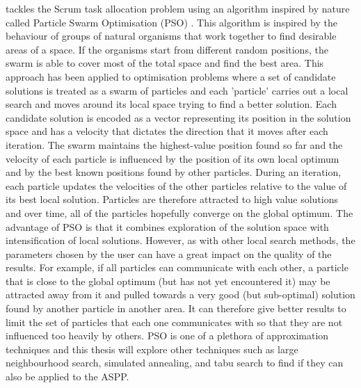 \citet{brezovcnik2018scrum} tackles the Scrum task allocation problem using an algorithm inspired by nature called Particle Swarm Optimisation (PSO) \citep{eberhart1995particle}. This algorithm is inspired by the behaviour of groups of natural organisms that work together to find desirable areas of a space. If the organisms start from different random positions, the swarm is able to cover most of the total space and find the best area. This approach has been applied to optimisation problems where a set of candidate solutions is treated as a swarm of particles and each 'particle' carries out a local search and moves around its local space trying to find a better solution. Each candidate solution is encoded as a vector representing its position in the solution space and has a velocity that dictates the direction that it moves after each iteration. The swarm maintains the highest-value position found so far and the velocity of each particle is influenced by the position of its own local optimum and by the best known positions found by other particles. During an iteration, each particle updates the velocities of the other particles relative to the value of its best local solution. Particles are therefore attracted to high value solutions and over time, all of the particles hopefully converge on the global optimum. The advantage of PSO is that it combines exploration of the solution space with intensification of local solutions. However, as with other local search methods, the parameters chosen by the user can have a great impact on the quality of the results. For example, if all particles can communicate with each other, a particle that is close to the global optimum (but has not yet encountered it) may be attracted away from it and pulled towards a very good (but sub-optimal) solution found by another particle in another area. It can therefore give better results to limit the set of particles that each one communicates with so that they are not influenced too heavily by others. PSO is one of a plethora of approximation techniques and this thesis will explore other techniques such as large neighbourhood search, simulated annealing, and tabu search to find if they can also be applied to the ASPP.

